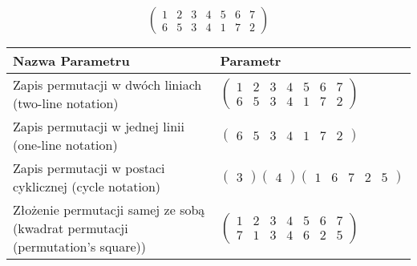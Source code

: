 \documentclass[12pt]{article}
\begin{document}
\subsection{}
\begin{center}
\[
\begin{pmatrix}
	1 & 2 & 3 & 4 & 5 & 6 & 7 \\ 
	6 & 5 & 3 & 4 & 1 & 7 & 2 
\end{pmatrix}
\]

\begin{tabular}{|m{0.6\linewidth}|m{0.4\linewidth}|}
	\hline
	Nazwa Parametru & Parametr \\
	\hline
	Zapis permutacji w dwóch liniach (two-line notation) & $\begin{pmatrix} 1 & 2 & 3 & 4 & 5 & 6 & 7 \\ 
6 & 5 & 3 & 4 & 1 & 7 & 2 \end{pmatrix}$ \\ 
	\hline
	Zapis permutacji w jednej linii (one-line notation) & $\begin{pmatrix} 6 & 5 & 3 & 4 & 1 & 7 & 2 \end{pmatrix}$ \\ 
	\hline
	Zapis permutacji w postaci cyklicznej (cycle notation) & $\begin{pmatrix} 3 \end{pmatrix} \begin{pmatrix} 4 \end{pmatrix} \begin{pmatrix} 1 & 6 & 7 & 2 & 5 \end{pmatrix} $ \\ 
	\hline
	Złożenie permutacji samej ze sobą (kwadrat permutacji (permutation's square)) & $\begin{pmatrix} 1 & 2 & 3 & 4 & 5 & 6 & 7 \\ 
7 & 1 & 3 & 4 & 6 & 2 & 5 \end{pmatrix}$ \\ 
	\hline
\end{tabular}
\end{center}
\end{document}
